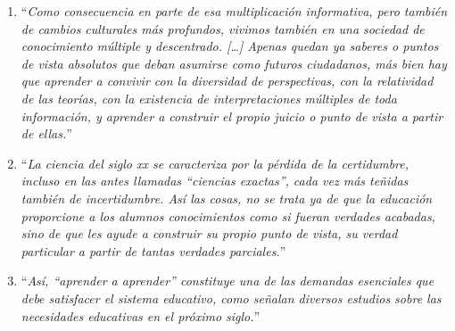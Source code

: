 \documentclass{article}
\begin{document}
\begin{enumerate}[label=\textbf{\arabic*.}, leftmargin=*, itemsep=8pt]
  \item “\emph{Como consecuencia en parte de esa multiplicación informativa, pero también de cambios culturales más profundos, vivimos también en una sociedad de conocimiento múltiple y descentrado. […] Apenas quedan ya saberes o puntos de vista absolutos que deban asumirse como futuros ciudadanos, más bien hay que aprender a convivir con la diversidad de perspectivas, con la relatividad de las teorías, con la existencia de interpretaciones múltiples de toda información, y aprender a construir el propio juicio o punto de vista a partir de ellas.}”

  \item “\emph{La ciencia del siglo xx se caracteriza por la pérdida de la certidumbre, incluso en las antes llamadas “ciencias exactas”, cada vez más teñidas también de incertidumbre. Así las cosas, no se trata ya de que la educación proporcione a los alumnos conocimientos como si fueran verdades acabadas, sino de que les ayude a construir su propio punto de vista, su verdad particular a partir de tantas verdades parciales.}”

  \item “\emph{Así, “aprender a aprender” constituye una de las demandas esenciales que debe satisfacer el sistema educativo, como señalan diversos estudios sobre las necesidades educativas en el próximo siglo.}”

\end{enumerate}
\end{document}
